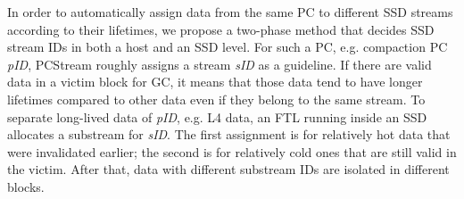 In order to automatically assign data from the same PC to different SSD streams
according to their lifetimes, we propose a two-phase method that decides SSD
stream IDs in both a host and an SSD level.  
For such a PC, e.g. compaction PC {\it pID}, {\sf PCStream} roughly assigns a
stream {\it sID} as a guideline.
If there are valid data in a victim block for GC, it means
that those data tend to have longer lifetimes compared to other data even if
they belong to the same stream.
To separate long-lived data of {\it pID}, e.g. L4 data, 
an FTL running inside an SSD allocates a substream for {\it sID}.
The first assignment is for relatively hot data that were invalidated
earlier; the second is for relatively cold ones that are still valid in the
victim.  After that, data with different substream IDs are isolated in
different blocks. 

